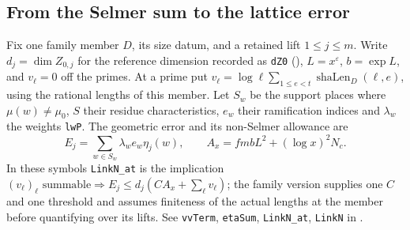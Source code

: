 \subsection{From the Selmer sum to the lattice error}\label{r23:link}
Fix one family member $D$, its size datum, and a retained lift $1\le j\le m$.
Write $d_j=\dim Z_{0,j}$ for the reference dimension recorded as
\nolinkurl{dZ0} (), $L=x^\varepsilon$, $b=\exp L$, and $v_\ell=0$ off the primes.
At a prime put $v_\ell=\log\ell\sum_{1\le e<t}\operatorname{shaLen}_{D}(\ell,e)$,
using the rational lengths of this member. Let $S_w$ be the support places
where $\mu(w)\ne\mu_0$, $S$ their residue characteristics, $e_w$ their
ramification indices and $\lambda_w$ the weights \nolinkurl{lwP}.
The geometric error and its non-Selmer allowance are
\[
 E_j=\sum_{w\in S_w}\lambda_w e_w\eta_j(w),\qquad
 A_x=fmbL^2+(\log x)^2N_c.
\]
In these symbols \nolinkurl{LinkN_at} is the implication
$\text{$(v_\ell)_\ell$ summable}\Rightarrow
 E_j\le d_j(CA_x+\sum_\ell v_\ell)$; the family version supplies
one $C$ and one threshold and assumes finiteness of the actual lengths at the
member before quantifying over its lifts.
See \nolinkurl{vvTerm}, \nolinkurl{etaSum}, \nolinkurl{LinkN_at},
\nolinkurl{LinkN} in .

